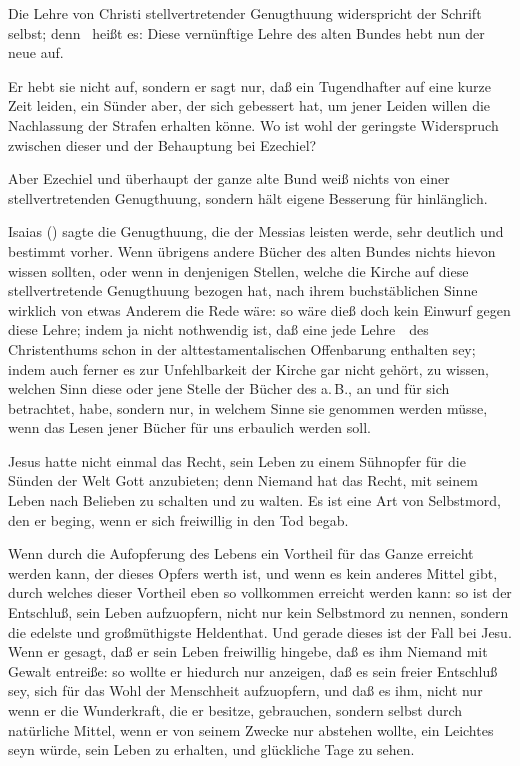 \begin{aufza}
\begin{aufzc}
\end{aufzc}
 Die Lehre von Christi stellvertretender Genugthuung widerspricht der Schrift selbst; denn \ heißt es:  Diese vernünftige Lehre des alten Bundes hebt nun der neue auf.\par
{} Er hebt sie nicht auf, sondern er sagt nur, daß ein Tugendhafter auf eine kurze Zeit leiden, ein Sünder aber, der sich gebessert hat, um jener Leiden willen die Nachlassung der Strafen erhalten könne. Wo ist wohl der geringste Widerspruch zwischen dieser und der Behauptung bei Ezechiel?\par
{} Aber Ezechiel und überhaupt der ganze alte Bund weiß nichts von einer stellvertretenden Genugthuung, sondern hält eigene Besserung für hinlänglich.\par
{} Isaias () sagte die Genugthuung, die der Messias leisten werde, sehr deutlich und bestimmt vorher. Wenn übrigens andere Bücher des alten Bundes nichts hievon wissen sollten, oder wenn in denjenigen Stellen, welche die Kirche auf diese stellvertretende Genugthuung bezogen hat, nach ihrem buchstäblichen Sinne wirklich von etwas Anderem die Rede wäre: so wäre dieß doch kein Einwurf gegen diese Lehre; indem ja nicht nothwendig ist, daß eine jede Lehre~\ des Christenthums schon in der alttestamentalischen Offenbarung enthalten sey; indem auch ferner es zur Unfehlbarkeit der Kirche gar nicht gehört, zu wissen, welchen Sinn diese oder jene Stelle der Bücher des a.\,B., an und für sich betrachtet, habe, sondern nur, in welchem Sinne sie genommen werden müsse, wenn das Lesen jener Bücher für uns erbaulich werden soll.\par
{} Jesus hatte nicht einmal das Recht, sein Leben zu einem Sühnopfer für die Sünden der Welt Gott anzubieten; denn Niemand hat das Recht, mit seinem Leben nach Belieben zu schalten und zu walten. Es ist eine Art von Selbstmord, den er beging, wenn er sich freiwillig in den Tod begab.\par
{} Wenn durch die Aufopferung des Lebens ein Vortheil für das Ganze erreicht werden kann, der dieses Opfers werth ist, und wenn es kein anderes Mittel gibt, durch welches dieser Vortheil eben so vollkommen erreicht werden kann: so ist der Entschluß, sein Leben aufzuopfern, nicht nur kein Selbstmord zu nennen, sondern die edelste und großmüthigste Heldenthat. Und gerade dieses ist der Fall bei Jesu. Wenn er gesagt, daß er sein Leben freiwillig hingebe, daß es ihm Niemand mit Gewalt entreiße: so wollte er hiedurch nur anzeigen, daß es sein freier Entschluß sey, sich für das Wohl der Menschheit aufzuopfern, und daß es ihm, nicht nur wenn er die Wunderkraft, die er besitze, gebrauchen, sondern selbst durch natürliche Mittel, wenn er von seinem Zwecke nur abstehen wollte, ein Leichtes seyn würde, sein Leben zu erhalten, und glückliche Tage zu sehen.\par

\end{aufza}
